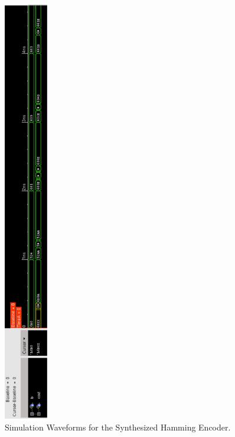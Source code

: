 \documentclass[ee577b,acmnow]{acmtrans2m}
\begin{document}
\hspace{-2cm}\begin{figure}
\begin{center}
\includegraphics[height=18.5cm]{postenc}
\caption{Simulation Waveforms for the Synthesized Hamming Encoder.}
\label{postencoder}
\end{center}
\end{figure}
\end{document}
